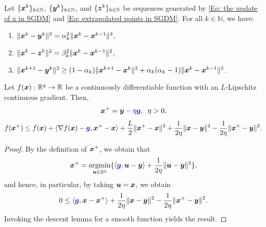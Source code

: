 \begin{proposition}
    \label{Pp: relations of xyz} Let $\{\bm{x}^{k}\}_{k \in \mathbb{N}}$,
    $\{\bm{y}^{k}\}_{k \in \mathbb{N}}$, and $\{\bm{z}^{k}\}_{k \in \mathbb{N}}$ be sequences
    generated by \eqref{Eq: the update of x in SGDM} and \eqref{Eq: extrapolated points in SGDM}. For all $k \in \mathbb{N}$,
    we have:
    \begin{enumerate}[label=(\roman{*})]
        \item $\|\bm{x}^{k}- \bm{y}^{k}\|^{2}= \alpha_{k}^{2}\|\bm{x}^{k}- \bm{x}^{k-1}\|^{2}$,

        \item $\|\bm{x}^{k}- \bm{z}^{k}\|^{2}= \beta_{k}^{2}\|\bm{x}^{k}- \bm{x}^{k-1}\|^{2}$,

        \item $\|\bm{x}^{k+1}- \bm{y}^{k}\|^{2}\geq (1 - \alpha_{k})\|\bm{x}^{k+1}- \bm{x}^{k}
            \|^{2}+ \alpha_{k}(\alpha_{k}- 1)\|\bm{x}^{k}- \bm{x}^{k-1}\|^{2}$.
    \end{enumerate}
\end{proposition}

\begin{lemma}
    \label{Lemma: auxiliary lemma for f} Let $f(\bm{x}): \mathbb{R}^{q}\rightarrow \mathbb{R}$
    be a continuously differentiable function with an $L$-Lipschitz continuous gradient.
    Then, 
    \[
        \bm{x}^{+}= \bm{y} - \eta {\color{blue}\bm{g}}, \hspace{5pt}\eta > 0,
    \]
    \begin{align}
        \label{Eq: auxiliary lemma for f}f(\bx^{+}) \leq f(\bx) + \langle \nabla f(\bx) - \blue{\bg}, \bx^{+}- \bx \rangle + \frac{L}{2}\|\bx^{+}- \bx\|^{2}+ \frac{1}{2\eta}\|\bx - \by\|^{2}- \frac{1}{2\eta}\|\bx^{+}- \by\|^{2}.
    \end{align}
\end{lemma}
\begin{proof}
    By the definition of $\bm{x}^{+}$, we obtain that
    \[
        \bm{x}^{+}= \operatorname*{\mathrm{argmin}}\limits_{\bm{u} \in \mathbb{R}^{q}}\{ \langle {\color{blue}\bm{g}}, \bm{u}
        - \bm{y} \rangle + \frac{1}{2\eta}\| \bm{u} - \bm{y}\|^{2}\},
    \]
    and hence, in particular, by taking $\bm{u} = \bm{x}$, we obtain
    \begin{align*}
        0 \leq \langle {\color{blue}\bm{g}}, \bm{x} - \bm{x}^{+}\rangle + \frac{1}{2\eta}\| \bm{x} - \bm{y}\|^{2}- \frac{1}{2\eta}\| \bm{x}^{+}- \bm{y}\|^{2}.
    \end{align*}
    Invoking the descent lemma for a smooth function yields the result. 
\end{proof}

